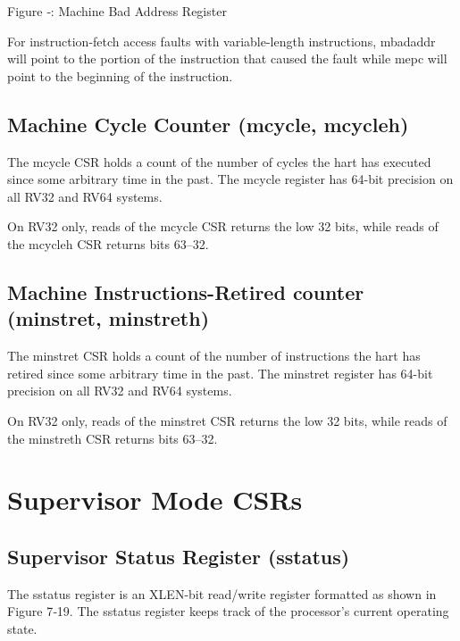 \missingfigure{}

Figure ‑: Machine Bad Address Register

For instruction-fetch access faults with variable-length instructions,
mbadaddr will point to the portion of the instruction that caused the
fault while mepc will point to the beginning of the instruction.

\subsection{Machine Cycle Counter (mcycle,
mcycleh)}\label{machine-cycle-counter-mcycle-mcycleh}

The mcycle CSR holds a count of the number of cycles the hart has
executed since some arbitrary time in the past. The mcycle register has
64-bit precision on all RV32 and RV64 systems.

On RV32 only, reads of the mcycle CSR returns the low 32 bits, while
reads of the mcycleh CSR returns bits 63--32.

\subsection{Machine Instructions-Retired counter (minstret,
minstreth)}\label{machine-instructions-retired-counter-minstret-minstreth}

The minstret CSR holds a count of the number of instructions the hart
has retired since some arbitrary time in the past. The minstret register
has 64-bit precision on all RV32 and RV64 systems.

On RV32 only, reads of the minstret CSR returns the low 32 bits, while
reads of the minstreth CSR returns bits 63--32.

\protect\hypertarget{_Toc327108358}{}{}

\section{Supervisor Mode CSRs}\label{supervisor-mode-csrs}

\subsection{Supervisor Status Register (sstatus)
}\label{supervisor-status-register-sstatus}

The sstatus register is an XLEN-bit read/write register formatted as
shown in Figure 7‑19. The sstatus register keeps track of the
processor's current operating state.

